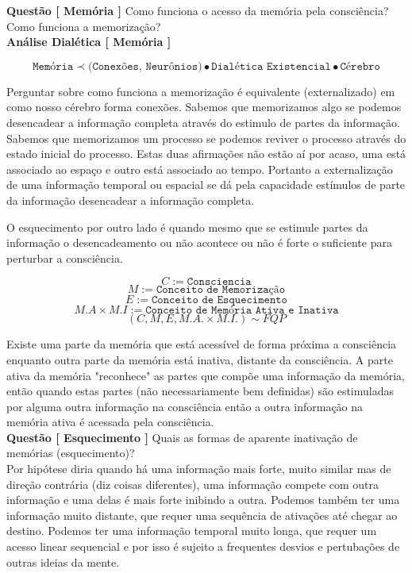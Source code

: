 \textbf{Questão [ Memória ]} Como funciona o acesso da memória pela consciência? Como funciona a memorização?\\

\textbf{Análise Dialética [ Memória ]}

$$ \texttt{Memória} \prec \texttt{(Conexões, Neurônios)} \bullet \texttt{Dialética Existencial} \bullet \texttt{Cérebro} $$

\hrulefill

Perguntar sobre como funciona a memorização é equivalente (externalizado) em como nosso cérebro forma conexões. Sabemos que memorizamos algo se podemos desencadear a informação completa através do estimulo de partes da informação. Sabemos que memorizamos um processo se podemos reviver o processo através do estado inicial do processo. Estas duas afirmações não estão aí por acaso, uma está associado ao espaço e outro está associado ao tempo. Portanto a externalização de uma informação temporal ou espacial se dá pela capacidade estímulos de parte da informação desencadear a informação completa.

O esquecimento por outro lado é quando mesmo que se estimule partes da informação o desencadeamento ou não acontece ou não é forte o suficiente para perturbar a consciência.

$$ C := \texttt{Consciencia} $$
$$ M := \texttt{Conceito de Memorização} $$
$$ E := \texttt{Conceito de Esquecimento} $$
$$ M.A \times M.I := \texttt{Conceito de Memória Ativa e Inativa} $$
$$ (C,M,E,M.A. \times M.I.) \sim FQP $$

\hrulefill

Existe uma parte da memória que está acessível de forma próxima a consciência enquanto outra parte da memória está inativa, distante da consciência. A parte ativa da memória "reconhece" as partes que compõe uma informação da memória, então quando estas partes (não necessariamente bem definidas) são estimuladas por alguma outra informação na consciência então a outra informação na memória ativa é acessada pela consciência.\\

\textbf{Questão [ Esquecimento ]} Quais as formas de aparente inativação de memórias (esquecimento)?\\

Por hipótese diria quando há uma informação mais forte, muito similar mas de direção contrária (diz coisas diferentes), uma informação compete com outra informação e uma delas é mais forte inibindo a outra. Podemos também ter uma informação muito distante, que requer uma sequência de ativações até chegar ao destino. Podemos ter uma informação temporal muito longa, que requer um acesso linear sequencial e por isso é sujeito a frequentes desvios e pertubações de outras ideias da mente.\\

